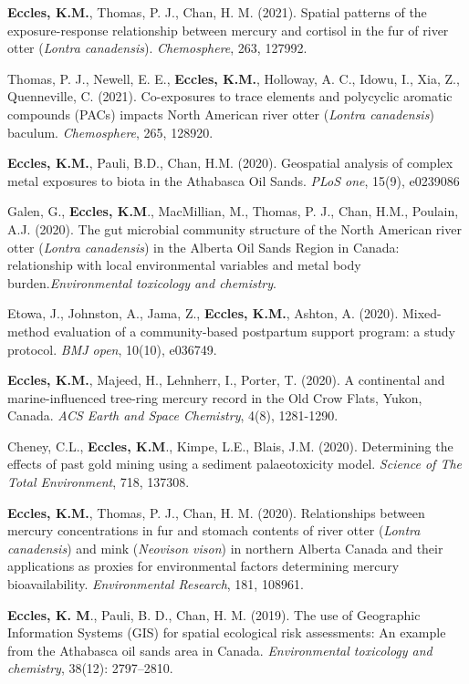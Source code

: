 \documentclass[margin,line]{res}
\begin{document}
\begin{resume}
\textbf{Eccles, K.M.}, Thomas, P. J., Chan, H. M. (2021). Spatial patterns of the exposure-response relationship between mercury and cortisol in the fur of river otter (\textit{Lontra canadensis}). \textit{Chemosphere}, 263, 127992.

Thomas, P. J., Newell, E. E., \textbf{Eccles, K.M.}, Holloway, A. C., Idowu, I., Xia, Z., Quenneville, C. (2021). Co-exposures to trace elements and polycyclic aromatic compounds (PACs) impacts North American river otter (\textit{Lontra canadensis}) baculum. \textit{Chemosphere}, 265, 128920.

\textbf{Eccles, K.M.}, Pauli, B.D., Chan, H.M. (2020). Geospatial analysis of complex metal exposures to biota in the Athabasca Oil Sands. \textit{PLoS one}, 15(9), e0239086

Galen, G., \textbf{Eccles, K.M}., MacMillian, M., Thomas, P. J., Chan, H.M., Poulain, A.J. (2020). The gut microbial community structure of the North American river otter (\textit{Lontra canadensis}) in the Alberta Oil Sands Region in Canada: relationship with local environmental variables and metal body burden.\textit{Environmental toxicology and chemistry}.

Etowa, J., Johnston, A., Jama, Z., \textbf{Eccles, K.M.}, Ashton, A. (2020). Mixed-method evaluation of a community-based postpartum support program: a study protocol. \textit{BMJ open}, 10(10), e036749.

\textbf{Eccles, K.M.}, Majeed, H., Lehnherr, I., Porter, T. (2020). A continental and marine-influenced tree-ring mercury record in the Old Crow Flats, Yukon, Canada. \textit{ACS Earth and Space Chemistry}, 4(8), 1281-1290.

Cheney, C.L., \textbf{Eccles, K.M}., Kimpe, L.E., Blais, J.M. (2020). Determining the effects of past gold mining using a sediment palaeotoxicity model. \textit{Science of The Total Environment}, 718, 137308.

\textbf{Eccles, K.M.}, Thomas, P. J., Chan, H. M. (2020). Relationships between mercury concentrations in fur and stomach contents of river otter (\textit{Lontra canadensis}) and mink (\textit{Neovison vison}) in northern Alberta Canada and their applications as proxies for environmental factors determining mercury bioavailability. \textit{Environmental Research}, 181, 108961.

\textbf{Eccles, K. M}., Pauli, B. D., Chan, H. M. (2019). The use of Geographic Information Systems (GIS) for spatial ecological risk assessments: An example from the Athabasca oil sands area in Canada. \textit{Environmental toxicology and chemistry}, 38(12): 2797–2810.


\end{resume}
\end{document}
